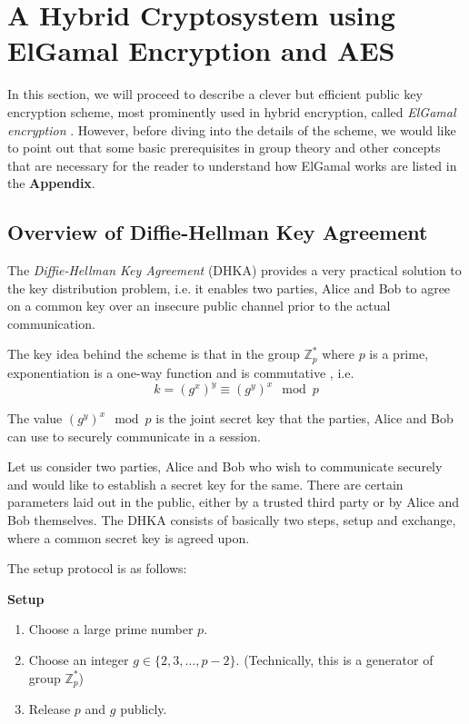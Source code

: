 \section{A Hybrid Cryptosystem using ElGamal Encryption and AES}

\label{sec:elgamal} 

In this section, we will proceed to describe a clever but efficient public key encryption scheme, most prominently used in hybrid encryption, called \textit{ElGamal encryption} \cite{Elgamal_1985}. 
However, before diving into the details of the scheme, we would like to point out that some basic prerequisites in group theory and other concepts that are necessary for the reader to understand how ElGamal works are listed in the \textbf{Appendix}.


\subsection{Overview of Diffie-Hellman Key Agreement}

\label{subsec:dhka} 

The \emph{Diffie-Hellman Key Agreement} (DHKA) provides a very practical solution to the key distribution problem, i.e. it enables two parties, Alice and Bob to agree on a common key over an insecure public channel prior to the actual communication.

The key idea behind the scheme is that in the group \( \mathbb{Z}^*_p \) where \( p \) is a prime, exponentiation is a one-way function and is commutative \cite{paar2009understanding}, i.e.
\begin{equation}
    k = (g^x)^y \equiv (g^y)^x \mod p
\end{equation}

The value \( (g^y)^x \mod p \) is the joint secret key that the parties, Alice and Bob can use to securely communicate in a session.

Let us consider two parties, Alice and Bob who wish to communicate securely and would like to establish a secret key for the same. 
There are certain parameters laid out in the public, either by a trusted third party or by Alice and Bob themselves. 
The DHKA consists of basically two steps, setup and exchange, where a common secret key is agreed upon.

The setup protocol is as follows:

\begin{tcolorbox}
\textbf{Setup} 

\begin{enumerate}
    \item Choose a large prime number \( p \).
    \item Choose an integer \( g \in \{2, 3, \ldots , p-2\} \). (Technically, this is a generator of group \( \mathbb{Z}^*_p \))
    \item Release \( p \) and \( g \) publicly.
\end{enumerate}
\end{tcolorbox}


